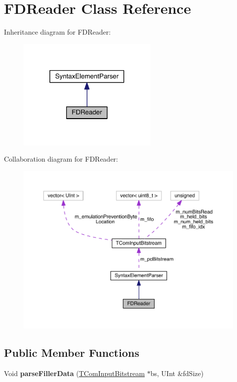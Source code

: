 \hypertarget{class_f_d_reader}{}\section{F\+D\+Reader Class Reference}
\label{class_f_d_reader}


Inheritance diagram for F\+D\+Reader\+:
\nopagebreak
\begin{figure}[H]
\begin{center}
\leavevmode
\includegraphics[width=193pt]{df/d5d/class_f_d_reader__inherit__graph}
\end{center}
\end{figure}


Collaboration diagram for F\+D\+Reader\+:
\nopagebreak
\begin{figure}[H]
\begin{center}
\leavevmode
\includegraphics[width=350pt]{d8/d9e/class_f_d_reader__coll__graph}
\end{center}
\end{figure}
\subsection*{Public Member Functions}
{\bf }\par
\begin{DoxyCompactItemize}
\item 
\mbox{\label{class_f_d_reader_ae4fd6c0ebbffc354c925e7277237b434}} 
Void {\bfseries parse\+Filler\+Data} (\hyperlink{class_t_com_input_bitstream}{T\+Com\+Input\+Bitstream} $\ast$bs, U\+Int \&fd\+Size)
\end{DoxyCompactItemize}

